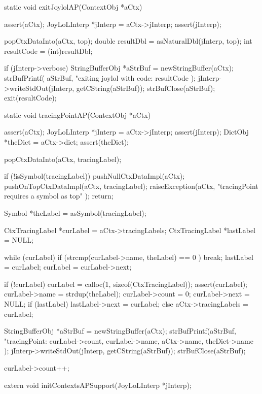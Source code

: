 \startCCode
static void exitJoylolAP(ContextObj *aCtx) {
  assert(aCtx);
  JoyLoLInterp *jInterp = aCtx->jInterp;
  assert(jInterp);
  
  popCtxDataInto(aCtx, top);
  double resultDbl  = asNaturalDbl(jInterp, top);
  int    resultCode = (int)resultDbl;
  
  if (jInterp->verbose) {
    StringBufferObj *aStrBuf = newStringBuffer(aCtx);
    strBufPrintf(
      aStrBuf,
      "exiting joylol with code: %
      resultCode
    );
    jInterp->writeStdOut(jInterp, getCString(aStrBuf));
    strBufClose(aStrBuf);
  }
  exit(resultCode);
}
\stopCCode

\startCCode
static void tracingPointAP(ContextObj *aCtx) {
  assert(aCtx);
  JoyLoLInterp *jInterp = aCtx->jInterp;
  assert(jInterp);
  DictObj *theDict = aCtx->dict;
  assert(theDict);
    
  popCtxDataInto(aCtx, tracingLabel);
  
  if (!isSymbol(tracingLabel)) {
    pushNullCtxDataImpl(aCtx);
    pushOnTopCtxDataImpl(aCtx, tracingLabel);
    raiseException(aCtx,
      "tracingPoint requires a symbol as top"
    );
    return;
  }
  
  Symbol *theLabel = asSymbol(tracingLabel);

  CtxTracingLabel *curLabel  = aCtx->tracingLabels;
  CtxTracingLabel *lastLabel = NULL;

  while (curLabel) {
    if (strcmp(curLabel->name, theLabel) == 0 ) break;
    lastLabel = curLabel;
    curLabel  = curLabel->next;
  }

  if (!curLabel) {
    curLabel = calloc(1, sizeof(CtxTracingLabel));
    assert(curLabel);
    curLabel->name  = strdup(theLabel);
    curLabel->count = 0;
    curLabel->next  = NULL;
    if (lastLabel) {
      lastLabel->next = curLabel;
    } else {
      aCtx->tracingLabels = curLabel;
    }
  }

  StringBufferObj *aStrBuf = newStringBuffer(aCtx);
  strBufPrintf(aStrBuf, "tracingPoint: %
    curLabel->count, curLabel->name, aCtx->name, theDict->name
  );
  jInterp->writeStdOut(jInterp, getCString(aStrBuf));
  strBufClose(aStrBuf);
  
  curLabel->count++;
}
\stopCCode

\startCHeader
extern void initContextsAPSupport(JoyLoLInterp *jInterp);
\stopCHeader
{}

